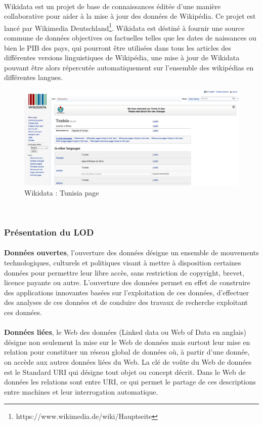 \paragraph{}
Wikidata est un projet de base de connaissances éditée d'une manière collaborative pour aider à la mise à jour des données de Wikipédia. Ce projet est lancé par Wikimedia Deutschland\footnote{https://www.wikimedia.de/wiki/Hauptseite}. Wikidata est déstiné à fournir une source commune de données objectives ou factuelles telles que les dates de naissances ou bien le PIB des pays, qui pourront être utilisées dans tous les articles des différentes versions linguistiques de Wikipédia, une mise à jour de Wikidata  pouvant être alors répercutée automatiquement sur l'ensemble des wikipédias en différentes langues.   
\begin{figure}[H]
\centering
\includegraphics[width=15cm]{wikidatapage.png}
\caption{Wikidata : Tunisia page}
\end{figure}
\
\subsubsection{Présentation du LOD}
\paragraph{}
{\bf Données ouvertes}, l'ouverture des données désigne un ensemble de mouvements technologiques, culturels et politiques visant à mettre à disposition certaines données pour permettre leur libre accès, sans restriction de copyright, brevet, licence payante ou autre.
L'ouverture des données permet en effet de construire des applications innovantes basées sur l'exploitation de ces données, d'effectuer des analyses de ces données et de conduire des travaux de recherche exploitant ces données.
\paragraph{}
{\bf Données liées}, le Web des données (Linked data ou Web of Data en anglais) désigne non seulement la mise sur le Web de données mais surtout leur mise en relation pour constituer un réseau global de données où, à partir d'une donnée, on accède aux autres données liées du Web. La clé de voûte du Web de données est le Standard URI qui désigne tout objet ou concept décrit. Dans le Web de données les relations sont entre URI, ce qui permet le partage de ces descriptions entre machines et leur interrogation automatique.
